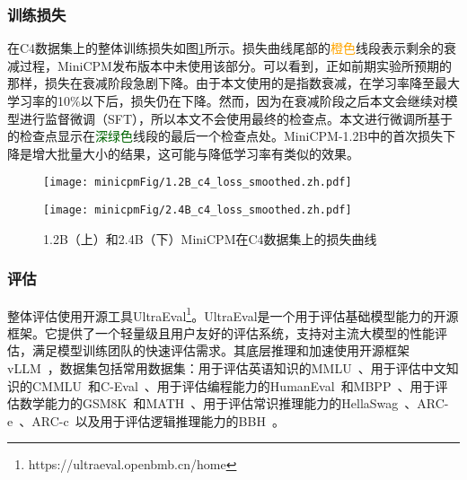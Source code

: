 \subsubsection{训练损失}


在C4数据集上的整体训练损失如图\ref{fig:loss_c4}所示。损失曲线尾部的\textcolor{orange}{橙色}线段表示剩余的衰减过程，MiniCPM发布版本中未使用该部分。可以看到，正如前期实验所预期的那样，损失在衰减阶段急剧下降。由于本文使用的是指数衰减，在学习率降至最大学习率的10\%以下后，损失仍在下降。然而，因为在衰减阶段之后本文会继续对模型进行监督微调（SFT），所以本文不会使用最终的检查点。本文进行微调所基于的检查点显示在\textcolor{darkgreen}{深绿色}线段的最后一个检查点处。MiniCPM-1.2B中的首次损失下降是增大批量大小的结果，这可能与降低学习率有类似的效果\cite{smith2017don}。


\begin{figure}[htbp]
    \begin{minipage}{\linewidth}
    \centering
        \texttt{[image: minicpmFig/1.2B\_c4\_loss\_smoothed.zh.pdf]}
    \end{minipage}
    \begin{minipage}{\linewidth}
    \centering
    \texttt{[image: minicpmFig/2.4B\_c4\_loss\_smoothed.zh.pdf]}
    \end{minipage}
    \caption{1.2B（上）和2.4B（下）MiniCPM在C4数据集上的损失曲线}
    \label{fig:loss_c4}
\end{figure}

\subsubsection{评估}
\label{sec:evaluation}
整体评估使用开源工具UltraEval\footnote{https://ultraeval.openbmb.cn/home}。UltraEval是一个用于评估基础模型能力的开源框架。它提供了一个轻量级且用户友好的评估系统，支持对主流大模型的性能评估，满足模型训练团队的快速评估需求。其底层推理和加速使用开源框架vLLM~\citep{kwon2023efficient}，数据集包括常用数据集：用于评估英语知识的MMLU~\citep{hendrycks2020measuring}、用于评估中文知识的CMMLU~\citep{li2024cmmlu}和C-Eval~\citep{huang2024c}、用于评估编程能力的HumanEval~\citep{chen2021evaluating}和MBPP~\citep{austin2021program}、用于评估数学能力的GSM8K~\citep{cobbe2021training}和MATH~\citep{hendrycks2021measuring}、用于评估常识推理能力的HellaSwag~\citep{zellers2019hellaswag}、ARC-e~\citep{clark2018think}、ARC-c~\citep{clark2018think}以及用于评估逻辑推理能力的BBH~\citep{suzgun2022challenging}。

